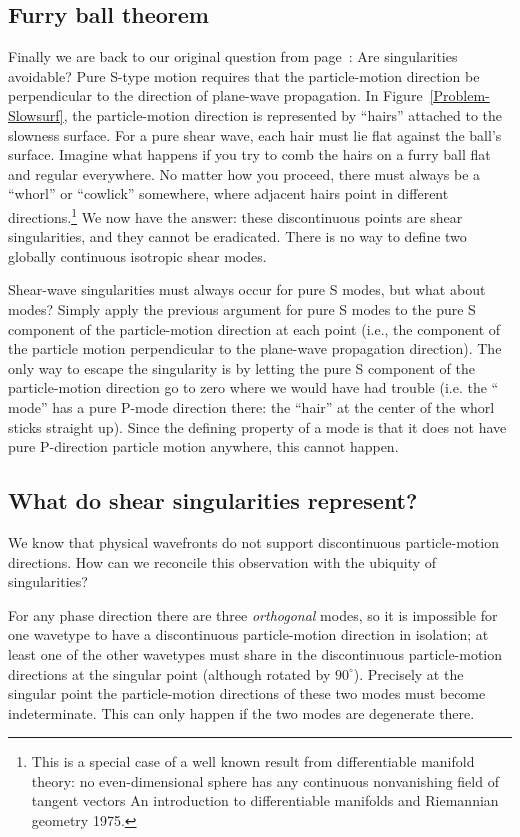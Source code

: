 \subsection{Furry ball theorem}

Finally we are back to our original question
from page~\pageref{Separ3-Question}:
Are singularities avoidable?
Pure S-type motion requires that the particle-motion direction
be perpendicular to the direction of plane-wave propagation.
In Figure~\ref{Problem-Slowsurf}, the particle-motion direction
is represented by ``hairs'' attached to the slowness surface.
For a pure shear wave, each hair must lie flat against
the ball's surface.
Imagine what happens if you try to comb the hairs
on a furry ball flat and regular everywhere.
No matter how you proceed, there must always be
a ``whorl'' or ``cowlick'' somewhere,
where adjacent hairs point in different directions.\footnote{
This is a special case of a well known result from
differentiable manifold theory:
no even-dimensional sphere has any continuous nonvanishing field of
tangent vectors
{An introduction to differentiable manifolds and Riemannian geometry}
{1975}.
}
We now have the answer: these discontinuous points
are shear singularities, and they cannot be eradicated.
There is no way to define two globally continuous
isotropic shear modes.

Shear-wave singularities must always occur for pure S modes,
but what about {\qS} modes?
Simply apply the previous argument for pure S modes
to the pure S component
of the particle-motion direction at each point (i.e., 
the component of the particle motion perpendicular
to the plane-wave propagation direction).
The only way to escape the singularity is by letting the
pure S component of the particle-motion direction go to zero
where we would have had trouble
(i.e. the ``{\qS} mode'' has a pure P-mode direction there:
the ``hair'' at the center of the whorl sticks straight up).
Since the defining property of a {\qS} mode is that
it does not have pure P-direction particle motion anywhere,
this cannot happen.

\subsection{What do shear singularities represent?}
We know that physical
wavefronts do not support discontinuous particle-motion directions.
How can we reconcile this observation with the ubiquity of singularities?

For any phase direction there are three {\em orthogonal} modes,
so it is impossible for one wavetype to have a discontinuous
particle-motion direction in isolation;
at least one of the other wavetypes
must share in the discontinuous particle-motion directions
at the singular point (although rotated by $90^\circ$).
Precisely at the singular point the particle-motion directions
of these two modes must become indeterminate.
This can only happen if the two modes are degenerate there.


